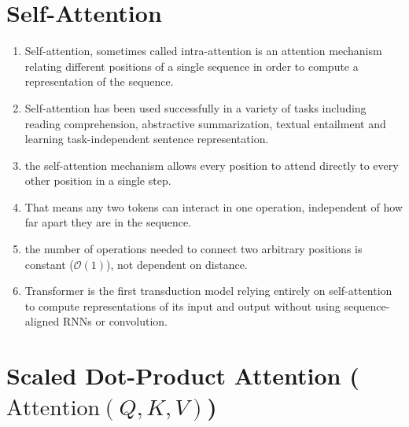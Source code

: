 \section{Self-Attention}

\begin{enumerate}
    \item Self-attention, sometimes called intra-attention is an attention mechanism relating different positions of a single sequence in order to compute a representation of the sequence. 
    \hfill \cite{arxiv/1706.03762/Attention-Is-All-You-Need}

    \item Self-attention has been used successfully in a variety of tasks including reading comprehension, abstractive summarization, textual entailment and learning task-independent sentence representation.
    \hfill \cite{arxiv/1706.03762/Attention-Is-All-You-Need}

    \item the self-attention mechanism allows every position to attend directly to every other position in a single step.
    \hfill \cite{common/online/chatgpt}

    \item That means any two tokens can interact in one operation, independent of how far apart they are in the sequence.
    \hfill \cite{common/online/chatgpt}

    \item the number of operations needed to connect two arbitrary positions is constant ($\mathcal{O}(1)$), not dependent on distance.
    \hfill \cite{common/online/chatgpt}

    \item Transformer is the first transduction model relying entirely on self-attention to compute representations of its input and output without using sequence-aligned RNNs or convolution. 
    \hfill \cite{arxiv/1706.03762/Attention-Is-All-You-Need}

\end{enumerate}





\section{Scaled Dot-Product Attention ($\text{Attention}(Q, K, V )$)}

